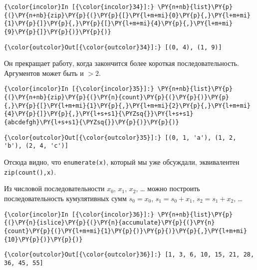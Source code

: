     \begin{Verbatim}[commandchars=\\\{\}]
{\color{incolor}In [{\color{incolor}34}]:} \PY{n+nb}{list}\PY{p}{(}\PY{n+nb}{zip}\PY{p}{(}\PY{p}{[}\PY{l+m+mi}{0}\PY{p}{,}\PY{l+m+mi}{1}\PY{p}{]}\PY{p}{,}\PY{p}{[}\PY{l+m+mi}{4}\PY{p}{,}\PY{l+m+mi}{9}\PY{p}{]}\PY{p}{)}\PY{p}{)}
\end{Verbatim}


\begin{Verbatim}[commandchars=\\\{\}]
{\color{outcolor}Out[{\color{outcolor}34}]:} [(0, 4), (1, 9)]
\end{Verbatim}
            
    Он прекращает работу, когда закончится более короткая
последовательность. Аргументов может быть и \(>2\).

    \begin{Verbatim}[commandchars=\\\{\}]
{\color{incolor}In [{\color{incolor}35}]:} \PY{n+nb}{list}\PY{p}{(}\PY{n+nb}{zip}\PY{p}{(}\PY{n}{count}\PY{p}{(}\PY{p}{)}\PY{p}{,}\PY{p}{[}\PY{l+m+mi}{1}\PY{p}{,}\PY{l+m+mi}{2}\PY{p}{,}\PY{l+m+mi}{4}\PY{p}{]}\PY{p}{,}\PY{l+s+s1}{\PYZsq{}}\PY{l+s+s1}{abcdefgh}\PY{l+s+s1}{\PYZsq{}}\PY{p}{)}\PY{p}{)}
\end{Verbatim}


\begin{Verbatim}[commandchars=\\\{\}]
{\color{outcolor}Out[{\color{outcolor}35}]:} [(0, 1, 'a'), (1, 2, 'b'), (2, 4, 'c')]
\end{Verbatim}
            
    Отсюда видно, что \texttt{enumerate(x)}, который мы уже обсуждали,
эквивалентен \texttt{zip(count(),x)}.

    Из числовой последовательности \(x_0\), \(x_1\), \(x_2\), \dots{} можно
построить последовательность кумулятивных сумм \(s_0=x_0\),
\(s_1=s_0+x_1\), \(s_2=s_1+x_2\), \dots{}

    \begin{Verbatim}[commandchars=\\\{\}]
{\color{incolor}In [{\color{incolor}36}]:} \PY{n+nb}{list}\PY{p}{(}\PY{n}{islice}\PY{p}{(}\PY{n}{accumulate}\PY{p}{(}\PY{n}{count}\PY{p}{(}\PY{l+m+mi}{1}\PY{p}{)}\PY{p}{)}\PY{p}{,}\PY{l+m+mi}{10}\PY{p}{)}\PY{p}{)}
\end{Verbatim}


\begin{Verbatim}[commandchars=\\\{\}]
{\color{outcolor}Out[{\color{outcolor}36}]:} [1, 3, 6, 10, 15, 21, 28, 36, 45, 55]
\end{Verbatim}
            
